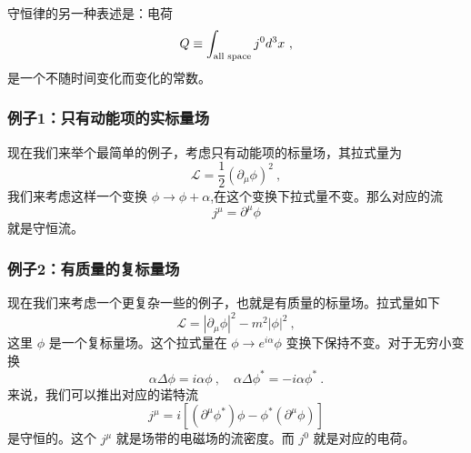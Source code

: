 守恒律的另一种表述是：电荷
\begin{equation}
Q \equiv \int_{\rm all\,\, space} j^0 d^3 x~,
\end{equation}
是一个不随时间变化而变化的常数。
\subsubsection{例子1：只有动能项的实标量场}
现在我们来举个最简单的例子，考虑只有动能项的标量场，其拉式量为
\begin{equation}
\mathcal L = \frac{1}{2} (\partial_\mu \phi)^2~,
\end{equation}
我们来考虑这样一个变换 $\phi \rightarrow \phi + \alpha $,在这个变换下拉式量不变。那么对应的流
\begin{equation}
j^\mu = \partial^\mu \phi
\end{equation}
就是守恒流。
\subsubsection{例子2：有质量的复标量场}
现在我们来考虑一个更复杂一些的例子，也就是有质量的标量场。拉式量如下
\begin{equation}
\mathcal L = |\partial_\mu\phi|^2 - m^2 |\phi|^2~,
\end{equation}
这里 $\phi$ 是一个复标量场。这个拉式量在 $\phi\rightarrow e^{i\alpha}\phi$ 变换下保持不变。对于无穷小变换
\begin{equation}\label{eq_classi_18}
\alpha \Delta \phi = i \alpha \phi~,\quad \alpha \Delta \phi^* = -i\alpha \phi^*~.
\end{equation}
来说，我们可以推出对应的诺特流
\begin{equation}
j^\mu = i[(\partial^\mu \phi^*)\phi-\phi^*(\partial^\mu \phi)]
\end{equation}
是守恒的。这个 $j^\mu$ 就是场带的电磁场的流密度。而 $j^0$ 就是对应的电荷。


